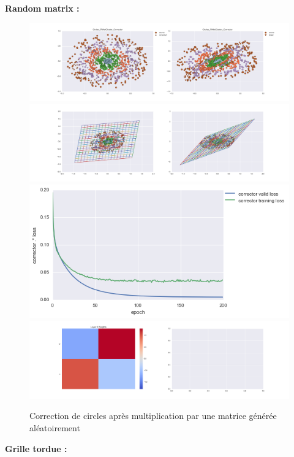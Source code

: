 {\Large \textbf{Random matrix :}}

\begin{figure}[H] %
\centering
\includegraphics[width=\linewidth]{fig/24-05-2016/circles/Circles_RMatCluster_Corrector-DATA.png}
\includegraphics[width=\linewidth]{fig/24-05-2016/circles/Circles_RMatCluster_Corrector-GridCheck.png}
\includegraphics[width=0.45\linewidth]{fig/24-05-2016/circles/Circles_RMatCluster_Corrector-Learning_curve.png}
\includegraphics[width=\linewidth]{fig/24-05-2016/circles/Circles_RMatCluster_Corrector-W.png}
\caption{Correction de circles après multiplication par une matrice générée aléatoirement}
\label{fig:recap-circles-RMat-cluster}
\end{figure}

{\Large \textbf{Grille tordue :}}

